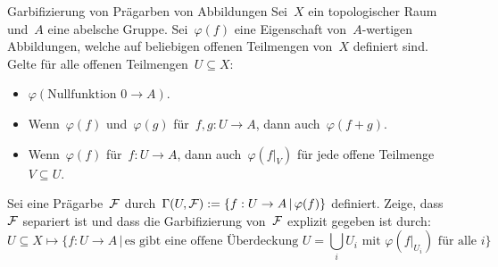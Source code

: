 \documentclass{uebblatt}
\begin{document}
\begin{aufgabe}{Garbifizierung von Prägarben von Abbildungen}
Sei~$X$ ein topologischer Raum und~$A$ eine abelsche Gruppe. Sei~$\varphi(f)$
eine Eigenschaft von~$A$-wertigen Abbildungen, welche auf beliebigen offenen
Teilmengen von~$X$ definiert sind. Gelte für alle offenen Teilmengen~$U
\subseteq X$:
\begin{itemize}
\item $\varphi(\text{Nullfunktion~$0 \to A$})$.
\item Wenn~$\varphi(f)$ und~$\varphi(g)$ für~$f,g:U \to A$, dann auch~$\varphi(f+g)$.
\item Wenn~$\varphi(f)$ für~$f:U \to A$, dann auch~$\varphi(f|_V)$ für jede
offene Teilmenge~$V \subseteq U$.
\end{itemize}
Sei eine Prägarbe~$\mathcal{F}$ durch~$\Gamma(U,\mathcal{F}) := \{ f : U \to A \,|\, \varphi(f)
\}$ definiert. Zeige, dass~$\mathcal{F}$ separiert ist und dass die Garbifizierung
von~$\mathcal{F}$ explizit gegeben ist durch:
\[ U \subseteq X \longmapsto
  \{ f : U \to A \,|\, \text{es gibt eine offene Überdeckung~$U = \bigcup_i
  U_i$ mit~$\varphi(f|_{U_i})$ für alle~$i$} \} \]
\end{aufgabe}
\end{document}
